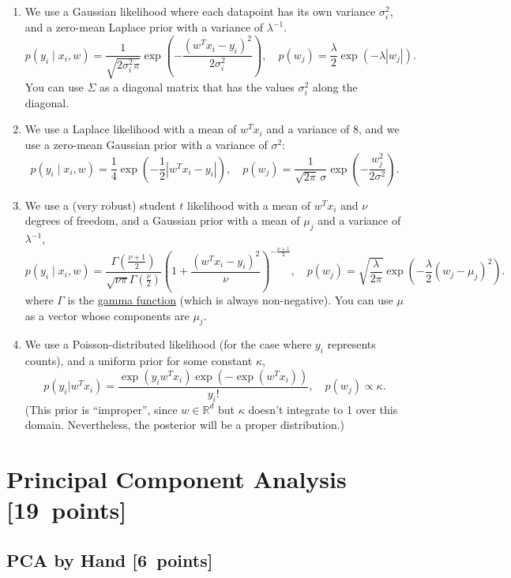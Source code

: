 \documentclass{article}
\newcommand\pts[1]{\textcolor{pointscolour}{[#1~points]}}
\def\R{\mathbb{R}}
\begin{document}
\begin{enumerate}

\item We use a Gaussian likelihood where each datapoint has its own variance $\sigma_i^2$, and a zero-mean Laplace prior with a variance of $\lambda^{-1}$.
\[
p(y_i \mid x_i,w) = \frac{1}{\sqrt{2\sigma_i^2\pi}}\exp\left(-\frac{(w^Tx_i - y_i)^2}{2\sigma_i^2}\right), \quad p(w_j) = \frac{\lambda}{2}\exp(-\lambda|w_j|).
\]
You can use $\Sigma$ as a diagonal matrix that has the values $\sigma_i^2$ along the diagonal.


\item We use a Laplace likelihood with a mean of $w^Tx_i$ and a variance of $8$, and we use a zero-mean Gaussian prior with a variance of $\sigma^2$:
\[
p(y_i \mid x_i, w) = \frac14 \exp\left(- \frac12 |w^Tx_i - y_i| \right), \quad
p(w_j) = \frac{1}{\sqrt{2\pi} \, \sigma} \exp\left(-\frac{w_j^2}{2\sigma^2} \right).
\]



 \item We use a (very robust) student $t$ likelihood with a mean of $w^Tx_i$ and $\nu$ degrees of freedom, and a Gaussian prior with a mean of $\mu_j$ and a variance of $\lambda^{-1}$,
\[
  p(y_i \mid x_i, w) = \frac{\Gamma\left(\frac{\nu + 1}{2}\right)}{\sqrt{\nu\pi}\Gamma\left(\frac \nu 2\right)}
                       \left(1 + \frac{(w^T x_i - y_i)^2}{\nu} \right)^{-\frac{\nu+1}{2}}
, \quad
  p(w_j) = \sqrt{\frac{\lambda}{2\pi}} \exp\left( -\frac\lambda2 (w_j - \mu_j)^2 \right).
\]
where $\Gamma$ is the \href{https://en.wikipedia.org/wiki/Gamma_function}{gamma function} (which is always non-negative).
You can use $\mu$ as a vector whose components are $\mu_j$.


\item We use a Poisson-distributed likelihood (for the case where $y_i$ represents counts), and a uniform prior for some constant $\kappa$,
\[
p(y_i | w^Tx_i) = \frac{\exp(y_iw^Tx_i)\exp(-\exp(w^Tx_i))}{y_i!}, \quad p(w_j) \propto \kappa.
\]
(This prior is 	``improper'', since $w\in\R^d$ but $\kappa$ doesn't integrate to 1 over this domain. Nevertheless, the posterior will be a proper distribution.)

\end{enumerate}


\clearpage
\section{Principal Component Analysis \pts{19}}
\subsection{PCA by Hand \pts{6}}
\end{document}
